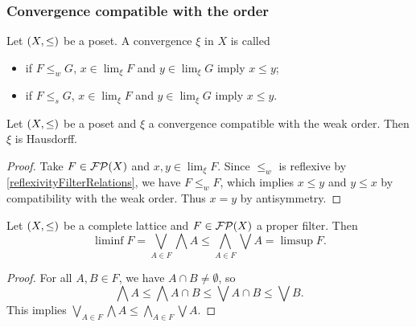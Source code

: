 \subsubsection{Convergence compatible with the order}

\begin{definition}
Let $\sSet{X,\leq}$ be a poset. A convergence $\xi$ in $X$ is called
\begin{itemize}
\item {} if $F \leq_w G$, $x\in\lim_\xi F$ and $y\in \lim_\xi G$ imply $x\leq y$;
\item {} if $F \leq_s G$, $x\in\lim_\xi F$ and $y\in \lim_\xi G$ imply $x\leq y$.
\end{itemize}
\end{definition}

\begin{lemma} \label{compatibleWeakOrderHausdorff}
Let $\sSet{X,\leq}$ be a poset and $\xi$ a convergence compatible with the weak order. Then $\xi$ is Hausdorff.
\end{lemma}
\begin{proof}
Take $F\in\operatorname{\mathcal{FP}}(X)$ and $x,y\in \lim_\xi F$. Since $\leq_w$ is reflexive by \ref{reflexivityFilterRelations}, we have $F\leq_w F$, which implies $x\leq y$ and $y\leq x$ by compatibility with the weak order. Thus $x=y$ by antisymmetry.
\end{proof}

\begin{lemma} \label{limsupLiminfInequality}
Let $\sSet{X,\leq}$ be a complete lattice and $F\in \operatorname{\mathcal{FP}}(X)$ a proper filter. Then
\[ \liminf F = \bigvee_{A\in F}\bigwedge A \leq \bigwedge_{A\in F}\bigvee A = \limsup F. \]
\end{lemma}
\begin{proof}
For all $A,B\in F$, we have $A\cap B\neq \emptyset$, so
\[ \bigwedge A \leq \bigwedge A\cap B \leq \bigvee A\cap B \leq \bigvee B. \]
This implies $\bigvee_{A\in F}\bigwedge A \leq \bigwedge_{A\in F}\bigvee A$.
\end{proof}

